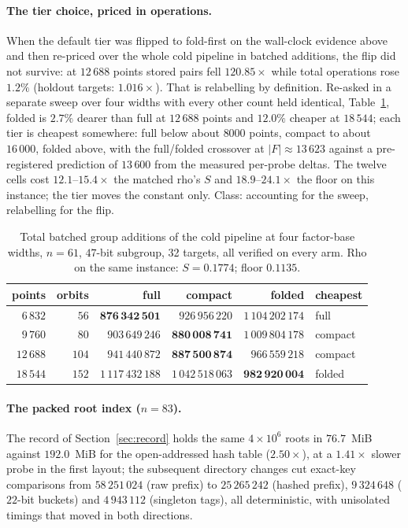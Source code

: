 \paragraph{The tier choice, priced in operations.}
When the default tier was flipped to fold-first on the wall-clock
evidence above and then re-priced over the whole cold pipeline in
batched additions, the flip did not survive: at $12\,688$ points
stored pairs fell $120.85\times$ while total operations rose $1.2\%$
(holdout targets: $1.016\times$). That is relabelling by definition.
Re-asked in a separate sweep over four widths with every other count
held identical, Table~\ref{tab:tier}, folded is $2.7\%$ dearer than
full at $12\,688$ points and $12.0\%$ cheaper at $18\,544$; each tier is cheapest somewhere: full below
about $8000$ points, compact to about $16\,000$, folded above, with
the full/folded crossover at $|F|\approx13\,623$ against a
pre-registered prediction of $13\,600$ from the measured per-probe
deltas. The twelve cells cost $12.1$--$15.4\times$ the matched rho's
$S$ and $18.9$--$24.1\times$ the floor on this instance; the tier moves the
constant only. Class: accounting for the sweep, relabelling for the
flip.

\begin{table}[t]
\centering\small
\caption{Total batched group additions of the cold pipeline at four factor-base widths, $n=61$, $47$-bit subgroup, 32 targets, all verified on every arm. Rho on the same instance: $S=0.1774$; floor $0.1135$.}
\label{tab:tier}
\begin{tabular}{@{}rrrrrl@{}}
\toprule
points & orbits & full & compact & folded & cheapest \\
\midrule
$6\,832$ & $56$ & $\mathbf{876\,342\,501}$ & $926\,956\,220$ & $1\,104\,202\,174$ & full \\
$9\,760$ & $80$ & $903\,649\,246$ & $\mathbf{880\,008\,741}$ & $1\,009\,804\,178$ & compact \\
$12\,688$ & $104$ & $941\,440\,872$ & $\mathbf{887\,500\,874}$ & $966\,559\,218$ & compact \\
$18\,544$ & $152$ & $1\,117\,432\,188$ & $1\,042\,518\,063$ & $\mathbf{982\,920\,004}$ & folded \\
\bottomrule
\end{tabular}
\end{table}

\paragraph{The packed root index ($n=83$).}
The record of Section~\ref{sec:record} holds the same $4\times10^6$
roots in $76.7$~MiB against $192.0$~MiB for the open-addressed hash
table ($2.50\times$), at a $1.41\times$ slower probe in the first
layout; the subsequent directory changes cut exact-key comparisons
from $58\,251\,024$ (raw prefix) to $25\,265\,242$ (hashed prefix),
$9\,324\,648$ ($22$-bit buckets) and $4\,943\,112$ (singleton tags),
all deterministic, with unisolated timings that moved in both
directions.

